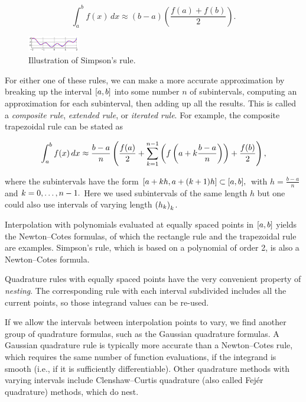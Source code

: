 \documentclass[a4paper]{article}
\begin{document}
\begin{equation*}
	\int _{a}^{b}f(x)\,dx\approx (b-a)\left({\frac {f(a)+f(b)}{2}}\right).
\end{equation*}

\begin{figure}
	\begin{center}
		\includegraphics[width=0.2\textwidth]{6}
	\end{center}
	\caption{Illustration of Simpson's rule.}
\end{figure}

For either one of these rules, we can make a more accurate approximation by breaking up the interval ${\displaystyle [a,b]}$  into some number $n$ of subintervals, computing an approximation for each subinterval, then adding up all the results. This is called a \textit{composite rule}, \textit{extended rule}, or \textit{iterated rule}. For example, the composite trapezoidal rule can be stated as

\begin{equation*}
	\int _{a}^{b}f(x)\,dx\approx {\frac {b-a}{n}}\left({f(a) \over 2}+\sum _{k=1}^{n-1}\left(f\left(a+k{\frac {b-a}{n}}\right)\right)+{f(b) \over 2}\right),
\end{equation*}

where the subintervals have the form ${\displaystyle [a+kh,a+(k+1)h]\subset [a,b],}$ with $h={\frac {b-a}{n}}$ and ${\displaystyle k=0,\ldots ,n-1.}$ Here we used subintervals of the same length $h$ but one could also use intervals of varying length ${\displaystyle \left(h_{k}\right)_{k}}$.

Interpolation with polynomials evaluated at equally spaced points in ${\displaystyle [a,b]}$ yields the Newton–Cotes formulas, of which the rectangle rule and the trapezoidal rule are examples. Simpson's rule, which is based on a polynomial of order 2, is also a Newton–Cotes formula.

Quadrature rules with equally spaced points have the very convenient property of \textit{nesting}. The corresponding rule with each interval subdivided includes all the current points, so those integrand values can be re-used.

If we allow the intervals between interpolation points to vary, we find another group of quadrature formulas, such as the Gaussian quadrature formulas. A Gaussian quadrature rule is typically more accurate than a Newton–Cotes rule, which requires the same number of function evaluations, if the integrand is smooth (i.e., if it is sufficiently differentiable). Other quadrature methods with varying intervals include Clenshaw–Curtis quadrature (also called Fej\'er quadrature) methods, which do nest.
\end{document}
